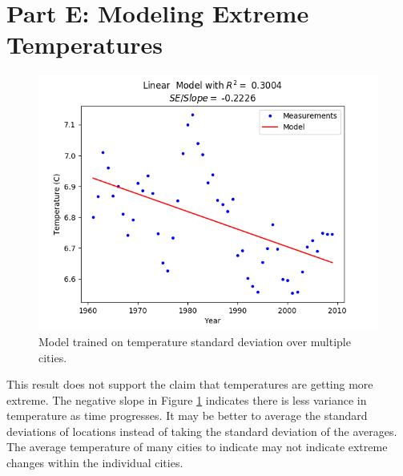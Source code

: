 \documentclass[letterpaper]{article}
\begin{document}
	\section*{Part E: Modeling Extreme Temperatures}
	\begin{figure}[h]
		\includegraphics[scale=0.625]{Figure_12_std}
		\centering
		\caption{Model trained on temperature standard deviation over multiple cities.}
		\label{fig:std}
	\end{figure}
	This result does not support the claim that temperatures are getting more extreme.
	The negative slope in Figure \ref{fig:std} indicates there is less variance in temperature as time progresses.
	It may be better to average the standard deviations of locations instead of taking the standard deviation of the averages.
	The average temperature of many cities to indicate may not indicate extreme changes within the individual cities.
\end{document}
